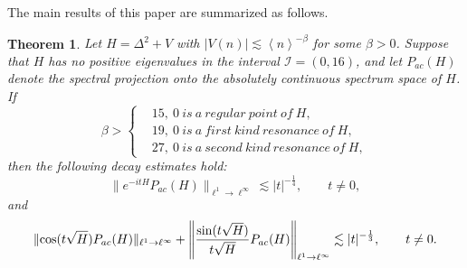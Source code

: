 \documentclass[reqno, 11pt]{amsart}
\newtheorem{theorem}[definition]{Theorem}
\newcommand\Z{\mathbb{Z}}
\newcommand\mcaI{\mathcal{I}}
\numberwithin{equation}{section}
\begin{document}
\vskip0.2cm
The main results of this paper are summarized as follows.
\begin{theorem}\label{main-theorem}
Let $H=\Delta^2+V$ with $|V(n)|\lesssim \left<n\right>^{-\beta}$ for some $\beta>0$. Suppose that $H$ has no positive eigenvalues in the interval $\mcaI=(0,16)$, and let $P_{ac}(H)$ denote the spectral projection onto the absolutely continuous spectrum space of $H$. If
 \begin{equation*}
 \beta>\left\{\begin{aligned}&15,\ 0\ is\ a\ regular\ point\ of\ H,\\
&19,\ 0\ is\ a\ first\ kind\ resonance\ of\ H,\\
&27,\ 0\ is\ a\ second\ kind\ resonance\ of\ H,
\end{aligned}\right.
\end{equation*}
then the following decay estimates hold:
\begin{equation}\label{eitH decay-estimate}
\|e^{-itH}P_{ac}(H)\|_{\ell^1\rightarrow\ell^{\infty}}\lesssim|t|^{-\frac{1}{4}},\qquad t\neq0,
\end{equation}
and
\begin{equation}\label{cos-sin decay-estimate}
\|{\rm cos}(t\sqrt H)P_{ac}(H)\|_{\ell^1\rightarrow\ell^{\infty}}+\left\|\frac{{\rm sin}(t\sqrt H)}{t\sqrt H}P_{ac}(H)\right\|_{\ell^1\rightarrow\ell^{\infty}}\lesssim|t|^{-\frac{1}{3}},\qquad t\neq0.
\end{equation}
\end{theorem}
\end{document}
